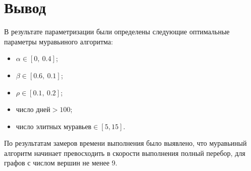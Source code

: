\section{Вывод}

В результате параметризации были определены следующие оптимальные параметры муравьиного алгоритма:
\begin{itemize}
	\item $\alpha \in [0,\ 0.4]$;
	\item $\beta \in [0.6,\ 0.1]$;
	\item $\rho \in [0.1,\ 0.2]$;
	\item $\text{число дней} > 100$;
	\item $\text{число элитных муравьев} \in [5, 15]$.
\end{itemize}

По результатам замеров времени выполнения было выявлено, что муравьиный алгоритм начинает превосходить в скорости выполнения полный перебор, для графов с числом вершин не менее 9.

\clearpage